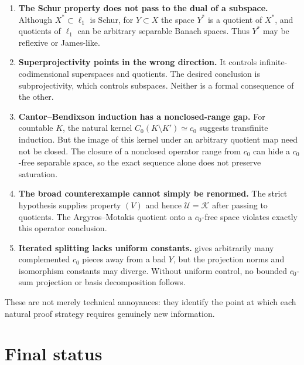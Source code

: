 \documentclass[11pt]{article}
\theoremstyle{definition}
\newcommand{\cU}{\mathcal U}
\newcommand{\cK}{\mathcal K}
\newcommand{\isom}{\simeq}
\begin{document}
\begin{enumerate}
\item \textbf{The Schur property does not pass to the dual of a subspace.}
      Although $X^*\subset\ell_1$ is Schur, for $Y\subset X$ the space
      $Y^*$ is a quotient of $X^*$, and quotients of $\ell_1$ can be
      arbitrary separable Banach spaces.  Thus $Y^*$ may be reflexive or
      James-like.

\item \textbf{Superprojectivity points in the wrong direction.}
      It controls infinite-codimensional superspaces and quotients.  The
      desired conclusion is subprojectivity, which controls subspaces.
      Neither is a formal consequence of the other.

\item \textbf{Cantor--Bendixson induction has a nonclosed-range gap.}
      For countable $K$, the natural kernel
      $C_0(K\setminus K')\isom c_0$ suggests transfinite induction.  But the
      image of this kernel under an arbitrary quotient map need not be
      closed.  The closure of a nonclosed operator range from $c_0$ can hide
      a $c_0$-free separable space, so the exact sequence alone does not
      preserve saturation.

\item \textbf{The broad counterexample cannot simply be renormed.}
      The strict hypothesis supplies property $(V)$ and hence
      $\cU=\cK$ after passing to quotients.  The Argyros--Motakis quotient
      onto a $c_0$-free space violates exactly this operator conclusion.

\item \textbf{Iterated splitting lacks uniform constants.}
       gives arbitrarily many complemented $c_0$ pieces
      away from a bad $Y$, but the projection norms and isomorphism constants
      may diverge.  Without uniform control, no bounded $c_0$-sum projection
      or basis decomposition follows.
\end{enumerate}

These are not merely technical annoyances: they identify the point at which
each natural proof strategy requires genuinely new information.

\section{Final status}
\end{document}
